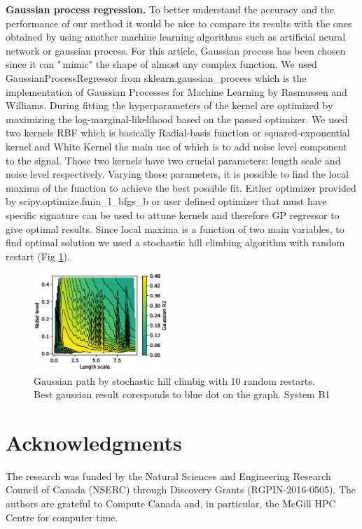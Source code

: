 \documentclass[aps,prl,reprint,amsmath,amssymb,nature]{revtex4-1}
\begin{document}
\textbf{Gaussian process regression. }To better understand the 
accuracy and the performance of our method it would be nice to compare 
its results with the ones obtained by using another machine learning 
algorithms such as artificial neural network or gaussian process. For 
this article, Gaussian process has been chosen since it can "\,mimic" 
the shape of almost any complex function. We used 
GaussianProcessRegressor from sklearn.gaussian\_process which is the 
implementation of Gaussian Processes for Machine Learning by Rasmussen 
and Williams. During fitting the hyperparameters of the kernel are 
optimized by maximizing the log-marginal-likelihood based on the passed 
optimizer. We used two kernels RBF which is basically Radial-basis 
function or squared-exponential kernel and White Kernel the main use of 
which is to add noise level component to the signal. Those two kernels 
have two crucial parameters: length scale and noise level respectively. 
Varying those parameters, it is possible to find the local maxima of the 
function to achieve the best possible fit. Either optimizer provided by 
scipy.optimize.fmin\_l\_bfgs\_b or user defined optimizer that must have 
specific signature can be used to attune kernels and therefore GP 
regressor to give optimal results. Since local maxima is a function of two main variables, to find optimal solution we used a stochastic hill climbing algorithm with random restart (Fig \ref{Fig:B1_Gaussian_path}). 

\begin{figure}
\includegraphics[width=0.45\textwidth]{media/B1_Gaussian_path.eps}
\caption{Gaussian path by stochastic hill climbig with 10 random restarts. Best gaussian result coresponds to blue dot on the graph. System B1}\label{Fig:B1_Gaussian_path}
\end{figure}

\section{Acknowledgments} 

The research was funded by the Natural Sciences and Engineering Research Council of Canada (NSERC) through Discovery
Grants (RGPIN-2016-0505). The authors are grateful to Compute Canada and, in particular, the McGill HPC Centre for computer time.
\end{document}
